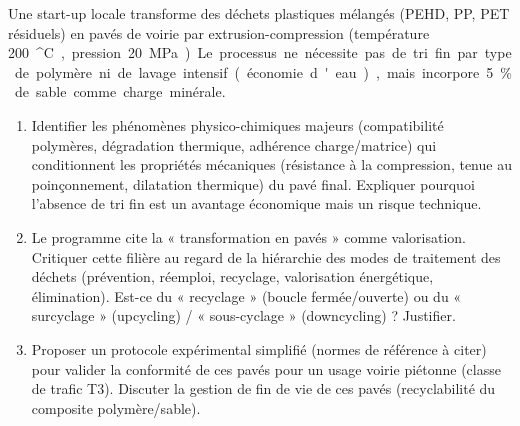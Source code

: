 \documentclass[11pt]{article}
\providecommand{\degree}{^{\circ}}
\begin{document}
\begin{exercice}
Une start-up locale transforme des déchets plastiques mélangés (PEHD, PP, PET résiduels) en pavés de voirie par extrusion-compression (température \SI{200}{\degree C}, pression \SI{20}{MPa}). Le processus ne nécessite pas de tri fin par type de polymère ni de lavage intensif (économie d'eau), mais incorpore \SI{5}{\%} de sable comme charge minérale.
\begin{enumerate}
    \item Identifier les phénomènes physico-chimiques majeurs (compatibilité polymères, dégradation thermique, adhérence charge/matrice) qui conditionnent les propriétés mécaniques (résistance à la compression, tenue au poinçonnement, dilatation thermique) du pavé final. Expliquer pourquoi l'absence de tri fin est un avantage économique mais un risque technique.
    \item Le programme cite la « transformation en pavés » comme valorisation. Critiquer cette filière au regard de la hiérarchie des modes de traitement des déchets (prévention, réemploi, recyclage, valorisation énergétique, élimination). Est-ce du « recyclage » (boucle fermée/ouverte) ou du « surcyclage » (upcycling) / « sous-cyclage » (downcycling) ? Justifier.
    \item Proposer un protocole expérimental simplifié (normes de référence à citer) pour valider la conformité de ces pavés pour un usage voirie piétonne (classe de trafic T3). Discuter la gestion de fin de vie de ces pavés (recyclabilité du composite polymère/sable).
\end{enumerate}
\end{exercice}
\end{document}

